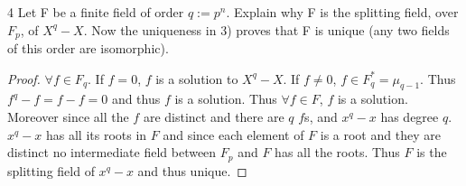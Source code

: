 \documentclass{article}
\begin{document}
\bigskip

\begin{PROB}{4}\label{Problem 4.}
    Let F be a finite field of order $q:= p^n$. Explain why F is the splitting field, over $F_p$, of $X^q - X.$ Now the uniqueness in 3) proves that F is unique (any two fields of this order are isomorphic).
\end{PROB}
\begin{proof}
    $\forall f \in F_q$. If $f = 0$, $f$ is a solution to $X^q - X$. If $f \neq 0$, $f \in F_q^* = \mu_{q - 1}$. Thus $f^q - f = f - f = 0$ and thus $f$ is a solution. Thus $\forall f \in F$, $f$ is a solution. Moreover since all the $f$ are distinct and there are $q$ $f$s, and $x^q - x$ has degree $q$. $x^q - x$ has all its roots in $F$ and since each element of $F$ is a root and they are distinct no intermediate field between $F_p$ and $F$ has all the roots. Thus $F$ is the splitting field of $x^q - x$ and thus unique.                           
\end{proof}

\bigskip
\end{document}
